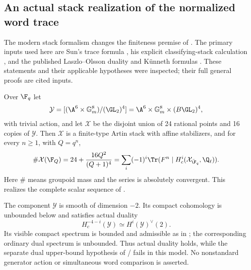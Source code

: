 \subsection{An actual stack realization of the normalized word trace}
The modern stack formalism changes the finiteness premise of
. The primary inputs used here are Sun's trace formula
\cite[Theorem~1.1, p.~49; Definition~4.1, p.~84; Theorem~4.2,
p.~85]{SunStacks}, his explicit classifying-stack calculation
\cite[Theorem~4.8 and \S4.8.2, pp.~89--90; Example~7.4,
p.~109]{SunStacks}, and the published Laszlo--Olsson duality and
K\"unneth formulas \cite[\S9.1, Lemmas~9.1.1--9.1.2, p.~198;
Theorem~11.0.14, p.~204]{LO2}. These statements and their applicable
hypotheses were inspected; their full general proofs are cited inputs.

\begin{finding}\label{f:stacktrace}
Over $\F_q$ let
\[
 \mathcal Y=[(\A^6\times\mathbb G_m^8)/(\GL_2)^4]
   =\A^6\times\mathbb G_m^8\times(B\GL_2)^4,
\]
with trivial action, and let $\mathcal X$ be the disjoint union
of 24 rational points and 16 copies of $\mathcal Y$.
Then $\mathcal X$ is a finite-type Artin stack with affine stabilizers,
and for every $n\ge1$, with $Q=q^n$,
\begin{equation}\label{eq:stackwordtrace}
 \#\mathcal X(\F_Q)
 =24+\frac{16Q^2}{(Q+1)^4}
 =\sum_i(-1)^i\Tr(F^n\mid H_c^i(\mathcal X_{\bar{\F}_q},\Q_\ell)).
\end{equation}
Here $\#$ means groupoid mass and the series is absolutely convergent.
This realizes the complete scalar sequence of .

The component $\mathcal Y$ is smooth of dimension $-2$.
Its compact cohomology is unbounded below and satisfies actual duality
\[
 H_c^{-4-i}(\mathcal Y)\simeq H^i(\mathcal Y)^\vee(2).
\]
Its visible compact spectrum is bounded and admissible as in
; the corresponding ordinary dual spectrum is unbounded.
Thus actual duality holds, while the separate dual upper-bound
hypothesis of / fails in this model.
No nonstandard generator action or simultaneous word comparison
is asserted.
\end{finding}

